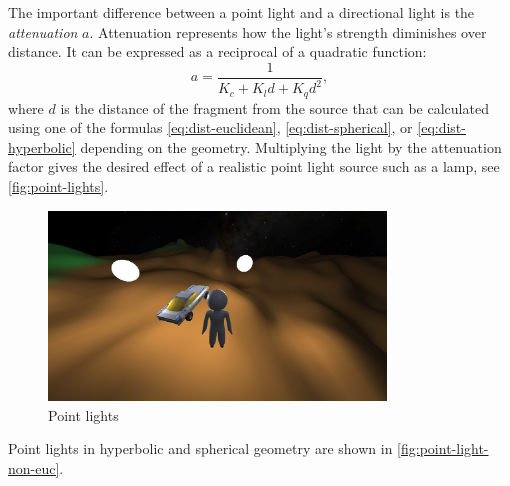 The important difference between a point light and a directional light is the \textit{attenuation} $a$.
Attenuation represents how the light's strength diminishes over distance.
It can be expressed as a reciprocal of a quadratic function:
\begin{equation}
    a = \frac{1}{K_c + K_l d + K_q d^2},
\end{equation}
where $d$ is the distance of the fragment from the source that can be calculated using one of the formulas \ref{eq:dist-euclidean}, \ref{eq:dist-spherical}, or \ref{eq:dist-hyperbolic} depending on the geometry.
Multiplying the light by the attenuation factor gives the desired effect of a realistic point light source such as a lamp, see \autoref{fig:point-lights}.
\begin{figure}[h]
    \centering
    \includegraphics[width=0.8\textwidth]{chapters/lighting/sections/lighting/resources/point-lights.png}
    \caption{Point lights}
    \label{fig:point-lights}
\end{figure}
Point lights in hyperbolic and spherical geometry are shown in \autoref{fig:point-light-non-euc}.
